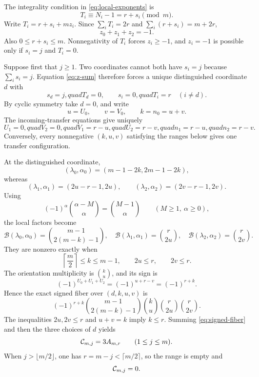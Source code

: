 \documentclass[11pt]{article}
\theoremstyle{definition}
\theoremstyle{remark}
\begin{document}
The integrality condition in \eqref{eq:local-exponents} is
\begin{equation}
T_i\equiv N_i-1=r+s_i\pmod m.
\label{eq:transfer-congruence}
\end{equation}
Write \(T_i=r+s_i+mz_i\).  Since
\(\sum_iT_i=2r\) and \(\sum_i(r+s_i)=m+2r\),
\begin{equation}
z_0+z_1+z_2=-1.
\label{eq:z-sum}
\end{equation}
Also \(0\le r+s_i\le m\).  Nonnegativity of \(T_i\) forces
\(z_i\ge-1\), and \(z_i=-1\) is possible only if \(s_i=j\) and
\(T_i=0\).

Suppose first that \(j\ge1\).  Two coordinates cannot both have \(s_i=j\)
because \(\sum_i s_i=j\).  Equation \eqref{eq:z-sum} therefore forces a
unique distinguished coordinate \(d\) with
\begin{equation}
s_d=j,quad T_d=0,
\qquad
s_i=0,quad T_i=r\quad(i\ne d).
\label{eq:distinguished-coordinate}
\end{equation}
By cyclic symmetry take \(d=0\), and write
\[
u=U_0,
\qquad
v=V_0,
\qquad
k=n_0=u+v.
\]
The incoming-transfer equations give uniquely
\begin{equation}
U_1=0,quad V_2=0,quad
V_1=r-u,quad U_2=r-v,quad
n_1=r-u,quad n_2=r-v.
\label{eq:incoming-flow}
\end{equation}
Conversely, every nonnegative \((k,u,v)\) satisfying the ranges below gives
one transfer configuration.

At the distinguished coordinate,
\[
(\lambda_0,\alpha_0)=(m-1-2k,2m-1-2k),
\]
whereas
\[
(\lambda_1,\alpha_1)=(2u-r-1,2u),
\qquad
(\lambda_2,\alpha_2)=(2v-r-1,2v).
\]
Using
\[
(-1)^\alpha\binom{\alpha-M}{\alpha}=\binom{M-1}{\alpha}
\qquad(M\ge1,\ \alpha\ge0),
\]
the local factors become
\begin{equation}
\mathcal{B}(\lambda_0,\alpha_0)
=\binom{m-1}{2(m-k)-1},
\quad
\mathcal{B}(\lambda_1,\alpha_1)=\binom{r}{2u},
\quad
\mathcal{B}(\lambda_2,\alpha_2)=\binom{r}{2v}.
\label{eq:three-local-factors}
\end{equation}
They are nonzero exactly when
\begin{equation}
\left\lceil\frac m2\right\rceil\le k\le m-1,
\qquad
2u\le r,
\qquad
2v\le r.
\label{eq:guarded-ranges}
\end{equation}
The orientation multiplicity is \(\binom{k}{u}\), and its sign is
\[
(-1)^{U_0+U_1+U_2}=(-1)^{u+r-v}=(-1)^{r+k}.
\]
Hence the exact signed fiber over \((d,k,u,v)\) is
\begin{equation}
(-1)^{r+k}
\binom{m-1}{2(m-k)-1}
\binom{k}{u}\binom{r}{2u}\binom{r}{2v}.
\label{eq:signed-fiber}
\end{equation}
The inequalities \(2u,2v\le r\) and \(u+v=k\) imply \(k\le r\).
Summing \eqref{eq:signed-fiber} and then the three choices of \(d\) yields
\begin{equation}
\mathcal{C}_{m,j}=3A_{m,r}
\qquad(1\le j\le m).
\label{eq:C-collapse-positive-j}
\end{equation}
When \(j>\lfloor m/2\rfloor\), one has
\(r=m-j<\lceil m/2\rceil\), so the range is empty and
\begin{equation}
\mathcal{C}_{m,j}=0.
\label{eq:C-empty-range}
\end{equation}
\end{document}
